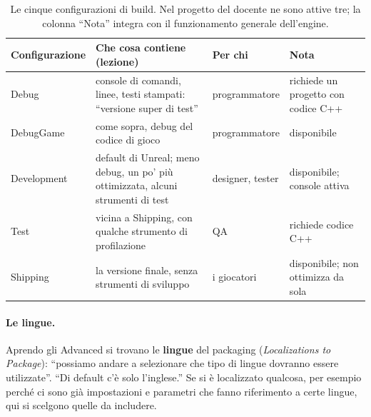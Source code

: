 \begin{table}[htbp]
\centering
\small
\begin{tabular}{@{}p{2.3cm}p{5.6cm}p{3.0cm}p{3.1cm}@{}}
\toprule
\textbf{Configurazione} & \textbf{Che cosa contiene (lezione)} & \textbf{Per chi} &
\textbf{Nota} \\
\midrule
Debug & console di comandi, linee, testi stampati: ``versione super di test'' &
programmatore & richiede un progetto con codice C++ \\
DebugGame & come sopra, debug del codice di gioco & programmatore & disponibile \\
Development & default di Unreal; meno debug, un po' più ottimizzata, alcuni strumenti di test
& designer, tester & disponibile; console attiva \\
Test & vicina a Shipping, con qualche strumento di profilazione & QA & richiede codice C++ \\
Shipping & la versione finale, senza strumenti di sviluppo & i giocatori & disponibile; non
ottimizza da sola \\
\bottomrule
\end{tabular}
\caption{Le cinque configurazioni di build. Nel progetto del docente ne sono attive tre; la
colonna ``Nota'' integra con il funzionamento generale dell'engine.}
\label{ue16:tab:build}
\end{table}

\paragraph{Le lingue.} Aprendo gli Advanced si trovano le \textbf{lingue} del packaging
(\emph{Localizations to Package}): ``possiamo andare a selezionare che tipo di lingue dovranno
essere utilizzate''. ``Di default c'è solo l'inglese.'' Se si è localizzato qualcosa, per
esempio perché ci sono già impostazioni e parametri che fanno riferimento a certe lingue, qui
si scelgono quelle da includere.

